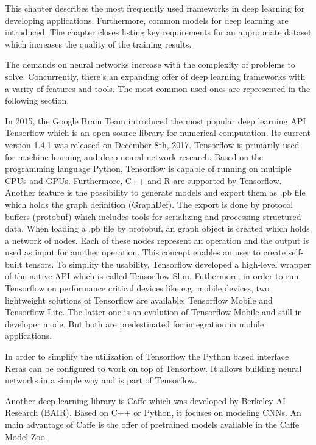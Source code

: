 This chapter describes the most frequently used frameworks in deep learning for developing applications. Furthermore, common models for deep learning are introduced. The chapter closes listing key requirements for an appropriate dataset which increases the quality of the training results.

The demands on neural networks increase with the complexity of problems to solve. Concurrently, there's an expanding offer of deep learning frameworks with a varity of features and tools. The most common used ones are represented in the following section.

In 2015, the Google Brain Team introduced the most popular deep learning API Tensorflow which is an open-source library for numerical computation. Its current version 1.4.1 was released on December 8th, 2017. Tensorflow is primarily used for machine learning and deep neural network research. Based on the programming language Python, Tensorflow is capable of running on multiple CPUs and GPUs. Furthermore, C++ and R are supported by Tensorflow. Another feature is the possibility to generate models and export them as .pb file which holds the graph definition (GraphDef). The export is done by protocol buffers (protobuf) which includes tools for serializing and processing structured data. When loading a .pb file by protobuf, an graph object is created which holds a network of nodes. Each of these nodes represent an operation and the output is used as input for another operation. This concept enables an user to create self-built tensors. To simplify the usability, Tensorflow developed a high-level wrapper of the native API which is called Tensorflow Slim. Futhermore, in order to run Tensorflow on performance critical devices like e.g. mobile devices, two lightweight solutions of Tensorflow are available: Tensorflow Mobile and Tensorflow Lite. The latter one is an evolution of Tensorflow Mobile and still in developer mode. But both are predestinated for integration in mobile applications.

In order to simplify the utilization of Tensorflow the Python based interface Keras can be configured to work on top of Tensorflow. It allows building neural networks in a simple way and is part of Tensorflow.

Another deep learning library is Caffe which was developed by Berkeley AI Research (BAIR). Based on C++ or Python, it focuses on modeling CNNs. An main advantage of Caffe is the offer of pretrained models available in the Caffe Model Zoo. 


